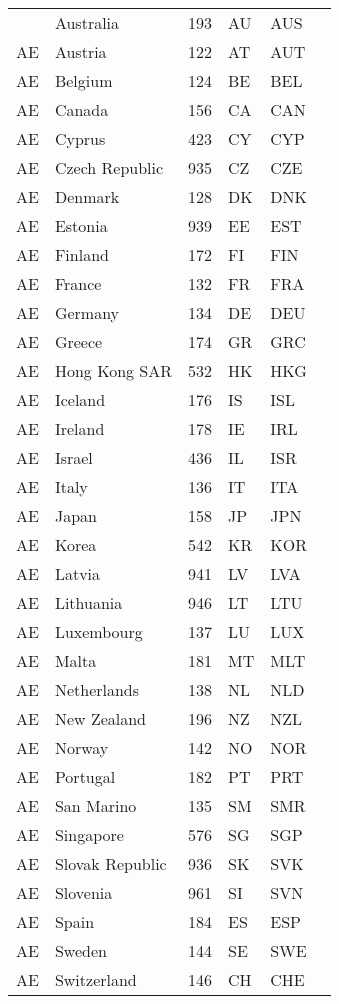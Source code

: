\documentclass[12pt,a4paper]{article}
\newcommand{\graph}[3]{
  \raisebox{-#1mm}{\texttt{[image: \#3]}}
}
\begin{document}
\begin{ThreePartTable}
\begin{longtable}
    {AE} & Australia & 193 & AU & AUS & \graph{1}{1}{./figures1-1} \\
{AE} & Austria & 122 & AT & AUT & \graph{1}{1}{./plot} \\
{AE} & Belgium & 124 & BE & BEL \\
{AE} & Canada & 156 & CA & CAN \\
{AE} & Cyprus & 423 & CY & CYP \\
{AE} & Czech Republic & 935 & CZ & CZE \\
{AE} & Denmark & 128 & DK & DNK \\
{AE} & Estonia & 939 & EE & EST \\
{AE} & Finland & 172 & FI & FIN \\
{AE} & France & 132 & FR & FRA \\
{AE} & Germany & 134 & DE & DEU \\
{AE} & Greece & 174 & GR & GRC \\
{AE} & Hong Kong SAR & 532 & HK & HKG \\
{AE} & Iceland & 176 & IS & ISL \\
{AE} & Ireland & 178 & IE & IRL \\
{AE} & Israel & 436 & IL & ISR \\
{AE} & Italy & 136 & IT & ITA \\
{AE} & Japan & 158 & JP & JPN \\
{AE} & Korea & 542 & KR & KOR \\
{AE} & Latvia & 941 & LV & LVA \\
{AE} & Lithuania & 946 & LT & LTU \\
{AE} & Luxembourg & 137 & LU & LUX \\
{AE} & Malta & 181 & MT & MLT \\
{AE} & Netherlands & 138 & NL & NLD \\
{AE} & New Zealand & 196 & NZ & NZL \\
{AE} & Norway & 142 & NO & NOR \\
{AE} & Portugal & 182 & PT & PRT \\
{AE} & San Marino & 135 & SM & SMR \\
{AE} & Singapore & 576 & SG & SGP \\
{AE} & Slovak Republic & 936 & SK & SVK \\
{AE} & Slovenia & 961 & SI & SVN \\
{AE} & Spain & 184 & ES & ESP \\
{AE} & Sweden & 144 & SE & SWE \\
{AE} & Switzerland & 146 & CH & CHE \\

\end{longtable}
\end{ThreePartTable}
\end{document}
